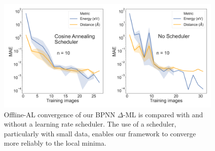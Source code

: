 \documentclass[%
 reprint,
 amsmath,amssymb,
 aps,
]{revtex4-2}
\begin{document}
\begin{figure}
    \centering
    \includegraphics[width=\textwidth]{figures/figure_S2.pdf}
    \caption{Offline-AL convergence of our BPNN $\Delta$-ML is compared with and without a learning rate scheduler. The use of a scheduler, particularly with small data, enables our framework to converge more reliably to the local minima.}
    \label{fig:scheduler}
\end{figure}
\end{document}
